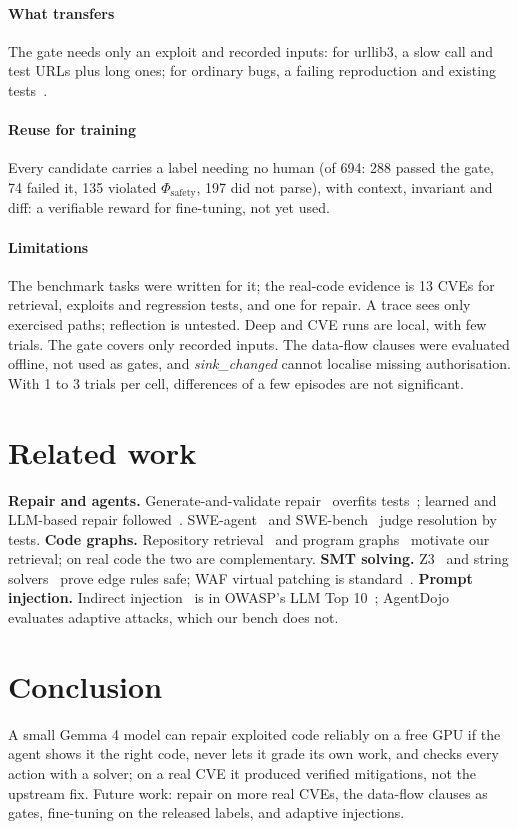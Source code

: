 \documentclass[journal]{IEEEtran}
\newcommand{\phisafe}{\ensuremath{\Phi_{\mathrm{safety}}}}
\begin{document}
\paragraph{What transfers} The gate needs only an exploit and recorded inputs: for urllib3, a slow call and test URLs plus long ones; for ordinary bugs, a failing reproduction and existing tests~\cite{swebench}.

\paragraph{Reuse for training} Every candidate carries a label needing no human (of 694: 288 passed the gate, 74 failed it, 135 violated \phisafe{}, 197 did not parse), with context, invariant and diff: a verifiable reward for fine-tuning, not yet used.

\paragraph{Limitations} The benchmark tasks were written for it; the real-code evidence is 13 CVEs for retrieval, exploits and regression tests, and one for repair. A trace sees only exercised paths; reflection is untested. Deep and CVE runs are local, with few trials. The gate covers only recorded inputs. The data-flow clauses were evaluated offline, not used as gates, and \emph{sink\_changed} cannot localise missing authorisation. With 1 to 3 trials per cell, differences of a few episodes are not significant.

\section{Related work}
\textbf{Repair and agents.} Generate-and-validate repair~\cite{genprog,monperrus} overfits tests~\cite{overfit}; learned and LLM-based repair followed~\cite{getafix,alpharepair}. SWE-agent~\cite{sweagent} and SWE-bench~\cite{swebench} judge resolution by tests. \textbf{Code graphs.} Repository retrieval~\cite{repocoder} and program graphs~\cite{allamanis} motivate our retrieval; on real code the two are complementary. \textbf{SMT solving.} Z3~\cite{z3} and string solvers~\cite{z3str3} prove edge rules safe; WAF virtual patching is standard~\cite{crs}. \textbf{Prompt injection.} Indirect injection~\cite{greshake} is in OWASP's LLM Top 10~\cite{owasp}; AgentDojo~\cite{agentdojo} evaluates adaptive attacks, which our bench does not.

\section{Conclusion}
A small Gemma 4 model can repair exploited code reliably on a free GPU if the agent shows it the right code, never lets it grade its own work, and checks every action with a solver; on a real CVE it produced verified mitigations, not the upstream fix. Future work: repair on more real CVEs, the data-flow clauses as gates, fine-tuning on the released labels, and adaptive injections.
\end{document}
